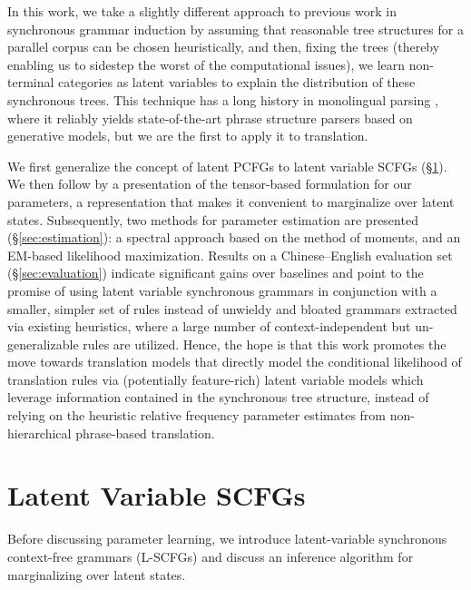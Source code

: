 \documentclass[11pt]{article}
\newcommand{\ignore}[1]{}
\begin{document}
In this work, we take a slightly different approach to previous work in synchronous grammar induction by assuming that reasonable tree structures for a parallel corpus can be chosen heuristically, and then, fixing the trees (thereby enabling us to sidestep the worst of the computational issues), we learn non-terminal categories as latent variables to explain the distribution of these synchronous trees. 
This technique has a long history in monolingual parsing \cite{Petrov2006,Liang2007,cohen-14b}, where it reliably yields state-of-the-art phrase structure parsers based on generative models, but we are the first to apply it to translation.

\ignore{Our approach refines single-category (``Hiero'') synchronous grammars by incorporating additional context via a latent variable model, featurized over inside and outside sub-trees of synchronous derivation trees for source-target sentence pairs.  }
We first generalize the concept of latent PCFGs to latent variable SCFGs (\S\ref{sec:formalism}). We then follow by a presentation of the tensor-based formulation for our parameters, a representation that makes it convenient to marginalize over latent states.  
Subsequently, two methods for parameter estimation are presented (\S\ref{sec:estimation}): a spectral approach based on the method of moments, and an EM-based likelihood maximization.  
Results on a Chinese--English evaluation set (\S\ref{sec:evaluation}) indicate significant gains over baselines and point to the promise of using latent variable synchronous grammars in conjunction with a smaller, simpler set of rules instead of unwieldy and bloated grammars extracted via existing heuristics, where a large number of context-independent but un-generalizable rules are utilized.  
Hence, the hope is that this work promotes the move towards translation models that directly model the conditional likelihood of translation rules via (potentially feature-rich) latent variable models which leverage information contained in the synchronous tree structure, instead of relying on the heuristic relative frequency parameter estimates \cite{Koehn2003} from non-hierarchical phrase-based translation.  

\section{Latent Variable SCFGs}
\label{sec:formalism}

Before discussing parameter learning, we introduce latent-variable synchronous context-free grammars (L-SCFGs) and discuss an inference algorithm for marginalizing over latent states.  
\end{document}
